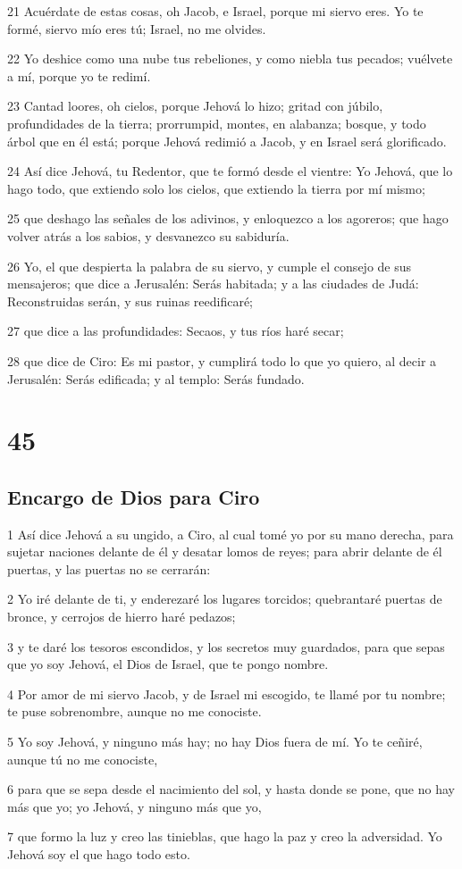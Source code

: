 \par 21 Acuérdate de estas cosas, oh Jacob, e Israel, porque mi siervo eres. Yo te formé, siervo mío eres tú; Israel, no me olvides.
\par 22 Yo deshice como una nube tus rebeliones, y como niebla tus pecados; vuélvete a mí, porque yo te redimí.
\par 23 Cantad loores, oh cielos, porque Jehová lo hizo; gritad con júbilo, profundidades de la tierra; prorrumpid, montes, en alabanza; bosque, y todo árbol que en él está; porque Jehová redimió a Jacob, y en Israel será glorificado.
\par 24 Así dice Jehová, tu Redentor, que te formó desde el vientre: Yo Jehová, que lo hago todo, que extiendo solo los cielos, que extiendo la tierra por mí mismo;
\par 25 que deshago las señales de los adivinos, y enloquezco a los agoreros; que hago volver atrás a los sabios, y desvanezco su sabiduría. 
\par 26 Yo, el que despierta la palabra de su siervo, y cumple el consejo de sus mensajeros; que dice a Jerusalén: Serás habitada; y a las ciudades de Judá: Reconstruidas serán, y sus ruinas reedificaré;
\par 27 que dice a las profundidades: Secaos, y tus ríos haré secar;
\par 28 que dice de Ciro: Es mi pastor, y cumplirá todo lo que yo quiero, al decir a Jerusalén: Serás edificada; y al templo: Serás fundado.

\chapter{45}

\section*{Encargo de Dios para Ciro}

\par 1 Así dice Jehová a su ungido, a Ciro, al cual tomé yo por su mano derecha, para sujetar naciones delante de él y desatar lomos de reyes; para abrir delante de él puertas, y las puertas no se cerrarán:
\par 2 Yo iré delante de ti, y enderezaré los lugares torcidos; quebrantaré puertas de bronce, y cerrojos de hierro haré pedazos;
\par 3 y te daré los tesoros escondidos, y los secretos muy guardados, para que sepas que yo soy Jehová, el Dios de Israel, que te pongo nombre.
\par 4 Por amor de mi siervo Jacob, y de Israel mi escogido, te llamé por tu nombre; te puse sobrenombre, aunque no me conociste.
\par 5 Yo soy Jehová, y ninguno más hay; no hay Dios fuera de mí. Yo te ceñiré, aunque tú no me conociste,
\par 6 para que se sepa desde el nacimiento del sol, y hasta donde se pone, que no hay más que yo; yo Jehová, y ninguno más que yo,
\par 7 que formo la luz y creo las tinieblas, que hago la paz y creo la adversidad. Yo Jehová soy el que hago todo esto.

